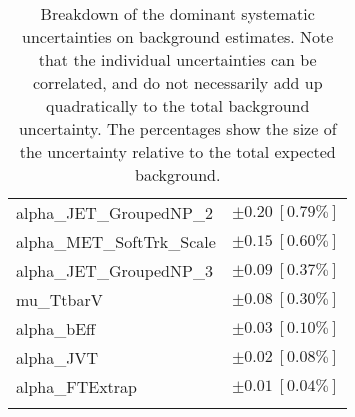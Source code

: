 \begin{table}
\begin{center}
\begin{tabular*}{\textwidth}{@{\extracolsep{\fill}}lc}
alpha\_JET\_GroupedNP\_2         & $\pm 0.20\ [0.79\%] $       \\
alpha\_MET\_SoftTrk\_Scale         & $\pm 0.15\ [0.60\%] $       \\
alpha\_JET\_GroupedNP\_3         & $\pm 0.09\ [0.37\%] $       \\
mu\_TtbarV         & $\pm 0.08\ [0.30\%] $       \\
alpha\_bEff         & $\pm 0.03\ [0.10\%] $       \\
alpha\_JVT         & $\pm 0.02\ [0.08\%] $       \\
alpha\_FTExtrap         & $\pm 0.01\ [0.04\%] $       \\
\noalign{\smallskip}\hline\noalign{\smallskip}
\end{tabular*}
\end{center}
\caption[Breakdown of uncertainty on background estimates]{
Breakdown of the dominant systematic uncertainties on background estimates.
Note that the individual uncertainties can be correlated, and do not necessarily add up quadratically to 
the total background uncertainty. The percentages show the size of the uncertainty relative to the total expected background.
\label{table.results.bkgestimate.uncertainties.SRC2}}
\end{table}
%